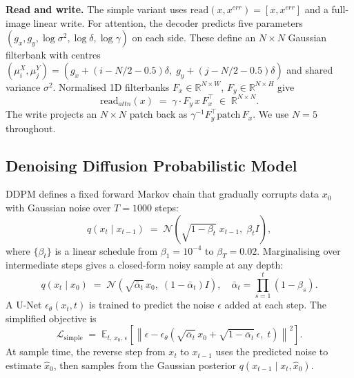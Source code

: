 \documentclass{article}
\begin{document}
\textbf{Read and write.}
The simple variant uses \(\mathrm{read}(x,x^{err}) = [x,x^{err}]\) and a
full-image linear write. For attention, the decoder predicts five parameters
\((g_x, g_y, \log\sigma^2, \log\delta, \log\gamma)\) on each side. These
define an \(N\times N\) Gaussian filterbank with centres
\((\mu^X_i,\mu^Y_j) = (g_x + (i - N/2 - 0.5)\delta,\;
g_y + (j - N/2 - 0.5)\delta)\) and shared variance \(\sigma^2\).
Normalised 1D filterbanks
\(F_x \in \mathbb{R}^{N\times W}\),
\(F_y \in \mathbb{R}^{N\times H}\) give
\begin{equation}
\mathrm{read}_{attn}(x) \;=\; \gamma \cdot F_y\, x\, F_x^\top
  \;\in\; \mathbb{R}^{N\times N}.
\label{eq:read}
\end{equation}
The write projects an \(N\times N\) patch back as
\(\gamma^{-1} F_y^\top \mathrm{patch}\, F_x\).
We use \(N = 5\) throughout.

\subsection{Denoising Diffusion Probabilistic Model}

DDPM \citep{ho2020ddpm} defines a fixed forward Markov chain that gradually
corrupts data \(x_0\) with Gaussian noise over \(T = 1000\) steps:
\begin{equation}
q(x_t \mid x_{t-1})
  \;=\; \mathcal{N}\!\left(\sqrt{1-\beta_t}\; x_{t-1},\;\beta_t I\right),
\end{equation}
where \(\{\beta_t\}\) is a linear schedule from \(\beta_1 = 10^{-4}\) to
\(\beta_T = 0.02\).  Marginalising over intermediate steps gives a closed-form
noisy sample at any depth:
\begin{equation}
q(x_t \mid x_0)
  \;=\; \mathcal{N}\!\left(\sqrt{\bar\alpha_t}\, x_0,\;
                       (1-\bar\alpha_t) I\right),
\quad \bar\alpha_t = \prod_{s=1}^{t}(1 - \beta_s).
\end{equation}
A U-Net \({\epsilon}_\theta(x_t, t)\) is trained to predict the noise
\(\epsilon\) added at each step.  The simplified objective is
\begin{equation}
\mathcal{L}_{\mathrm{simple}}
  \;=\; \mathbb{E}_{t,\, x_0,\, \epsilon}\!\left[
      \left\| \epsilon
        - \epsilon_\theta\!\left(\sqrt{\bar\alpha_t}\, x_0
          + \sqrt{1-\bar\alpha_t}\,\epsilon,\; t\right)
      \right\|^2\right].
\label{eq:ddpm_loss}
\end{equation}
At sample time, the reverse step from \(x_t\) to \(x_{t-1}\) uses the
predicted noise to estimate \(\hat{x}_0\), then samples from the Gaussian
posterior \(q(x_{t-1}\mid x_t, \hat{x}_0)\).
\end{document}
